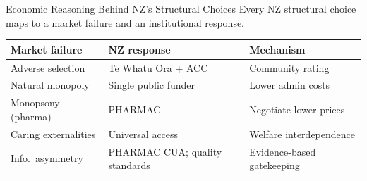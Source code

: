 \documentclass[aspectratio=169, 12pt]{beamer}
\begin{document}
\begin{frame}{Economic Reasoning Behind NZ's Structural Choices}
  \small Every NZ structural choice maps to a market failure and an institutional response.

  \vspace{0.3em}
  {\footnotesize
  \begin{tabular}{p{3.2cm}p{3.8cm}p{3.8cm}}
    \toprule
    \textbf{Market failure} & \textbf{NZ response} & \textbf{Mechanism} \\
    \midrule
    Adverse selection & Te Whatu Ora + ACC & Community rating \\
    Natural monopoly & Single public funder & Lower admin costs \\
    Monopsony (pharma) & PHARMAC & Negotiate lower prices \\
    Caring externalities & Universal access & Welfare interdependence \\
    Info.\ asymmetry & PHARMAC CUA; quality standards & Evidence-based gatekeeping \\
    \bottomrule
  \end{tabular}}
\end{frame}

\end{document}
